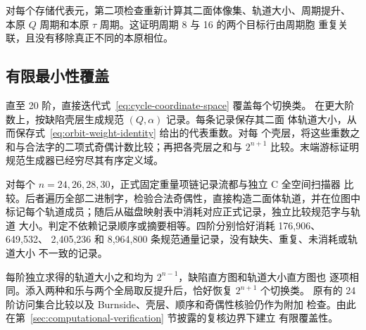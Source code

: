 对每个存储代表元，第二项检查重新计算其二面体像集、轨道大小、周期提升、
本原 \(Q\) 周期和本原 \(\tau\) 周期。这证明周期 8 与 16 的两个目标行由周期胞
重复关联，且没有移除真正不同的本原相位。

\subsection{有限最小性覆盖}

直至 20 阶，直接迭代式~\eqref{eq:cycle-coordinate-space} 覆盖每个切换类。
在更大阶数上，按缺陷壳层生成规范 \((Q,\alpha)\) 记录。每条记录保存其二面
体轨道大小，从而保存式~\eqref{eq:orbit-weight-identity} 给出的代表重数。对每
个壳层，将这些重数之和与合法字的二项式奇偶计数比较；再把各壳层之和与
\(2^{n+1}\) 比较。末端游标证明规范生成器已经穷尽其有序定义域。

对每个 \(n=24,26,28,30\)，正式固定重量项链记录流都与独立 C 全空间扫描器
比较。后者遍历全部二进制字，检验合法奇偶性，直接构造二面体轨道，并在位图中
标记每个轨道成员；随后从磁盘映射表中消耗对应正式记录，独立比较规范字与轨道
大小。判定不依赖记录顺序或摘要相等。四阶分别恰好消耗 176,906、649,532、
2,405,236 和 8,964,800 条规范通量记录，没有缺失、重复、未消耗或轨道大小
不一致的记录。

每阶独立求得的轨道大小之和均为 \(2^{n-1}\)，缺陷直方图和轨道大小直方图也
逐项相同。添入两种和乐与两个全局取反提升后，恰好恢复 \(2^{n+1}\) 个切换类。
原有的 24 阶访问集合比较以及 Burnside、壳层、顺序和奇偶性核验仍作为附加
检查。由此在第~\ref{sec:computational-verification} 节披露的复核边界下建立
有限覆盖性。
